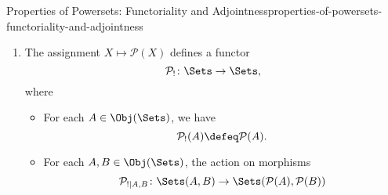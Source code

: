 \begin{proposition}{Properties of Powersets: Functoriality and Adjointness}{properties-of-powersets-functoriality-and-adjointness}
\begin{enumerate}
\begin{itemize}
                \item{}For each $A\in\Obj(\Sets)$, we have
                    \[
                        \mathcal{P}^{-1}(A)%
                        \defeq%
                        \mathcal{P}(A).%
                    \]%
                \item{}For each $A,B\in\Obj(\Sets)$, the action on morphisms
                    \[
                        \mathcal{P}^{-1}_{A,B}%
                        \colon%
                        \Sets(A,B)%
                        \to%
                        \Sets(\mathcal{P}(B),\mathcal{P}(A))%
                    \]%
                    of $\mathcal{P}^{-1}$ at $(A,B)$ is the map defined by by sending a map of sets $f\colon A\to B$ to the map
                    \[
                        \mathcal{P}^{-1}(f)%
                        \colon%
                        \mathcal{P}(B)%
                        \to%
                        \mathcal{P}(A)%
                    \]%
                    defined by
                    \[
                        \mathcal{P}^{-1}(f)%
                        \defeq%
                        f^{-1},%
                    \]%
                    as in \cref{the-inverse-image-function-associated-to-a-function}.
            \end{itemize}
        \item\label{properties-of-powersets-functoriality-and-adjointness-functoriality-3}The assignment $X\mapsto\mathcal{P}(X)$ defines a functor
            \[
                \mathcal{P}_{!}%
                \colon%
                \Sets%
                \to%
                \Sets,%
            \]%
            where
            \begin{itemize}
                \item{}For each $A\in\Obj(\Sets)$, we have
                    \[
                        \mathcal{P}_{!}(A)%
                        \defeq%
                        \mathcal{P}(A).%
                    \]%
                \item{}For each $A,B\in\Obj(\Sets)$, the action on morphisms
                    \[
                        \mathcal{P}_{!|A,B}%
                        \colon%
                        \Sets(A,B)%
                        \to%
                        \Sets(\mathcal{P}(A),\mathcal{P}(B))%
                    \]%

\end{itemize}
\end{enumerate}
\end{proposition}
